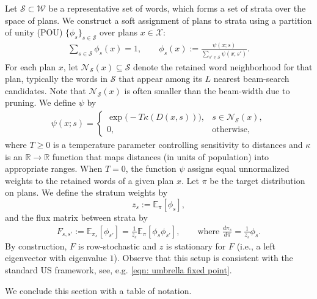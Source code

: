 Let $\mathcal{S}\subset\mathcal{W}$ be a representative set of words, which forms a set of strata over the space of plans.
We construct a soft assignment of plans to strata using a partition of unity (POU) $\{\phi_s\}_{s\in \mathcal{S}}$ over plans $x\in\mathcal{X}$:
\begin{align}\label{eq:pou}
    \sum_{s\in \mathcal{S}}\phi_s(x)=1,\qquad
    \phi_s(x):=\frac{\psi(x;s)}{\sum_{s'\in \mathcal{S}}\psi(x;s')}.
\end{align}
For each plan $x$, let $\mathcal{N}_{\mathcal{S}}(x)\subseteq\mathcal{S}$ denote the retained word neighborhood for that plan, typically the words in $\mathcal{S}$ that appear among its $L$ nearest beam-search candidates.
Note that $\mathcal{N}_{\mathcal{S}}(x)$ is often smaller than the beam-width due to pruning.
We define $\psi$ by
\begin{align}\label{eq:psi_relative}
    \psi(x;s)=
    \begin{cases}
        \exp\!\big(-T\kappa(D(x,s))), & s\in\mathcal{N}_{\mathcal{S}}(x),\\
        0, & \text{otherwise,}
    \end{cases}
\end{align}
where $T\geq 0$ is a temperature parameter controlling sensitivity to distances and $\kappa$ is an $\mathbb{R}\to\mathbb{R}$ function that maps distances (in units of population) into appropriate ranges.
When $T=0$, the function $\psi$ assigns equal unnormalized weights to the retained words of a given plan $x$.
Let $\pi$ be the target distribution on plans.
We define the stratum weights by
\[
    z_s := \mathbb{E}_{\pi}[\phi_s],
\]
and the flux matrix between strata by
\begin{align}\label{eq:flux}
    F_{s,s'} := \mathbb{E}_{\pi_s}[\phi_{s'}]
    = \frac{1}{z_s}\mathbb{E}_{\pi}[\phi_s\phi_{s'}],
    \qquad \text{where } \frac{d\pi_s}{d\pi}=\frac{1}{z_s}\phi_s.
\end{align}
By construction, $F$ is row-stochastic and $z$ is stationary for $F$ (i.e., a left eigenvector with eigenvalue $1$).
Observe that this setup is consistent with the standard US framework, see, e.g. \eqref{eqn: umbrella fixed point}.


We conclude this section with a table of notation.

